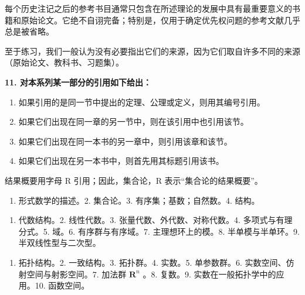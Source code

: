 每个历史注记之后的参考书目通常只包含在所述理论的发展中具有最重要意义的书籍和原始论文。它绝不自诩完备；特别是，仅用于确定优先权问题的参考文献几乎总是被省略。

至于练习，我们一般认为没有必要指出它们的来源，因为它们取自许多不同的来源（原始论文、教科书、习题集）。

\par\noindent\textbf{11. 对本系列某一部分的引用如下给出：}\par

\begin{enumerate}
\def\labelenumi{\alph{enumi})}
\item
  如果引用的是同一节中提出的定理、公理或定义，则用其编号引用。
\item
  如果它们出现在同一章的另一节中，则在该引用中也引用该节。
\item
  如果它们出现在同一本书的另一章中，则引用该章和该节。
\item
  如果它们出现在另一本书中，则首先用其标题引用该书。
\end{enumerate}

结果概要用字母 R 引用；因此，集合论，R 表示“集合论的结果概要”。



\begin{enumerate}
\def\labelenumi{\arabic{enumi}.}
\tightlist
\item
  形式数学的描述。2. 集合论。3. 有序集；基数；自然数。4. 结构。
\end{enumerate}


\begin{enumerate}
\def\labelenumi{\arabic{enumi}.}
\tightlist
\item
  代数结构。2. 线性代数。3. 张量代数、外代数、对称代数。4. 多项式与有理分式。5. 域。6. 有序群与有序域。7. 主理想环上的模。8. 半单模与半单环。9. 半双线性型与二次型。
\end{enumerate}


\begin{enumerate}
\def\labelenumi{\arabic{enumi}.}
\tightlist
\item
  拓扑结构。2. 一致结构。3. 拓扑群。4. 实数。5. 单参数群。6. 实数空间、仿射空间与射影空间。7. 加法群 \(\mathbf{R}^n\) 。8. 复数。9. 实数在一般拓扑学中的应用。10. 函数空间。
\end{enumerate}

